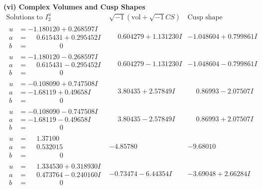 \documentclass[1p]{elsarticle_modified}
\theoremstyle{definition}
\newcommand{\I}{\sqrt{-1}}
\begin{document}
\newpage\flushleft \textbf{(vi) Complex Volumes and Cusp Shapes}
$$\begin{array}{c|c|c}  
\text{Solutions to }I^u_{2}& \I (\text{vol} + \sqrt{-1}CS) & \text{Cusp shape}\\
 \hline 
\begin{aligned}
u &= -1.180120 + 0.268597 I \\
a &= \phantom{-}0.615431 + 0.295452 I \\
b &= \phantom{-0.000000 } 0\end{aligned}
 & \phantom{-}0.604279 + 1.131230 I & -1.048604 + 0.799861 I \\ \hline\begin{aligned}
u &= -1.180120 - 0.268597 I \\
a &= \phantom{-}0.615431 - 0.295452 I \\
b &= \phantom{-0.000000 } 0\end{aligned}
 & \phantom{-}0.604279 - 1.131230 I & -1.048604 - 0.799861 I \\ \hline\begin{aligned}
u &= -0.108090 + 0.747508 I \\
a &= -1.68119 + 0.49658 I \\
b &= \phantom{-0.000000 } 0\end{aligned}
 & \phantom{-}3.80435 + 2.57849 I & \phantom{-}0.86993 - 2.07507 I \\ \hline\begin{aligned}
u &= -0.108090 - 0.747508 I \\
a &= -1.68119 - 0.49658 I \\
b &= \phantom{-0.000000 } 0\end{aligned}
 & \phantom{-}3.80435 - 2.57849 I & \phantom{-}0.86993 + 2.07507 I \\ \hline\begin{aligned}
u &= \phantom{-}1.37100\phantom{ +0.000000I} \\
a &= \phantom{-}0.532015\phantom{ +0.000000I} \\
b &= \phantom{-0.000000 } 0\end{aligned}
 & -4.85780\phantom{ +0.000000I} & -9.68010\phantom{ +0.000000I} \\ \hline\begin{aligned}
u &= \phantom{-}1.334530 + 0.318930 I \\
a &= \phantom{-}0.473764 - 0.240160 I \\
b &= \phantom{-0.000000 } 0\end{aligned}
 & -0.73474 - 6.44354 I & -3.69048 + 2.66284 I \\ \hline\begin{aligned}

\end{aligned}
\end{array}$$
\end{document}
